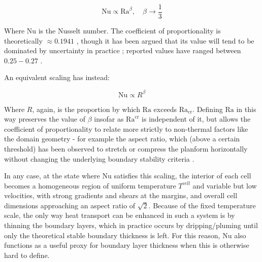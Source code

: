 \documentclass[a4paper,11pt,oneside]{book}
\begin{document}
\begin{equation}
\mathrm{Nu} \propto \mathrm{Ra}^{\beta}, \quad \beta \to \frac{1}{3}
\end{equation}

Where $\mathrm{Nu}$ is the Nusselt number. The coefficient of proportionality is theoretically $\approx 0.1941$ \cite{Olson1987-do}, though it has been argued that its value will tend to be dominated by uncertainty in practice \cite{Lenardic2003-wd}; reported values have ranged between $0.25 -0.27$ \citet{Olson1987-do, Jarvis1989-qj}.

An equivalent scaling \cite{Jarvis1982-ua} has instead:

\begin{equation}
\mathrm{Nu} \propto R^{\beta}
\end{equation}

Where $R$, again, is the proportion by which $\mathrm{Ra}$ exceeds $\mathrm{Ra}_{\mathrm{cr}}$. Defining $\mathrm{Ra}$ in this way preserves the value of $\beta$ insofar as $\mathrm{Ra}^{\mathrm{cr}}$ is independent of it, but allows the coefficient of proportionality to relate more strictly to non-thermal factors like the domain geometry - for example the aspect ratio, which (above a certain threshold) has been observed to stretch or compress the planform horizontally without changing the underlying boundary stability criteria \cite{Jarvis1982-ua}.

In any case, at the state where $\mathrm{Nu}$ satisfies this scaling, the interior of each cell becomes a homogeneous region of uniform temperature $T^{cell}$ and variable but low velocities, with strong gradients and shears at the margins, and overall cell dimensions approaching an aspect ratio of $\sqrt{2}$. Because of the fixed temperature scale, the only way heat transport can be enhanced in such a system is by thinning the boundary layers, which in practice occurs by dripping/pluming until only the theoretical stable boundary thickness is left. For this reason, $\mathrm{Nu}$ also functions as a useful proxy for boundary layer thickness when this is otherwise hard to define.
\end{document}
